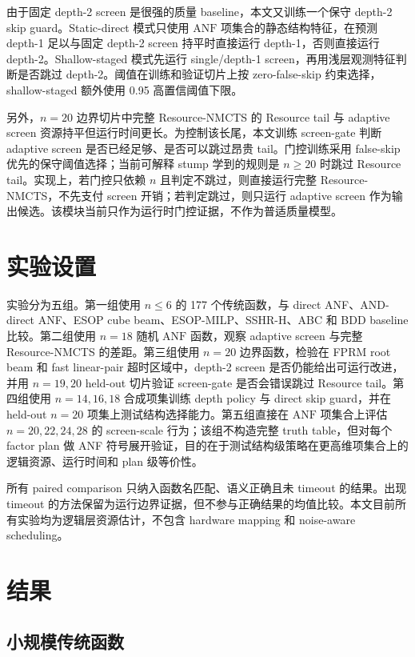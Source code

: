 \documentclass[UTF8,fontset=macnew,11pt]{ctexart}
\newcommand{\method}{Resource-NMCTS}
\newcommand{\anf}{\ensuremath{\mathrm{ANF}}}
\begin{document}
由于固定 depth-2 screen 是很强的质量 baseline，本文又训练一个保守 depth-2 skip guard。Static-direct 模式只使用 \anf{} 项集合的静态结构特征，在预测 depth-1 足以与固定 depth-2 screen 持平时直接运行 depth-1，否则直接运行 depth-2。Shallow-staged 模式先运行 single/depth-1 screen，再用浅层观测特征判断是否跳过 depth-2。阈值在训练和验证切片上按 zero-false-skip 约束选择，shallow-staged 额外使用 0.95 高置信阈值下限。

另外，$n=20$ 边界切片中完整 \method{} 的 Resource tail 与 adaptive screen 资源持平但运行时间更长。为控制该长尾，本文训练 screen-gate 判断 adaptive screen 是否已经足够、是否可以跳过昂贵 tail。门控训练采用 false-skip 优先的保守阈值选择；当前可解释 stump 学到的规则是 $n\geq20$ 时跳过 Resource tail。实现上，若门控只依赖 $n$ 且判定不跳过，则直接运行完整 \method{}，不先支付 screen 开销；若判定跳过，则只运行 adaptive screen 作为输出候选。该模块当前只作为运行时门控证据，不作为普适质量模型。

\section{实验设置}

实验分为五组。第一组使用 $n\leq6$ 的 177 个传统函数，与 direct ANF、AND-direct ANF、ESOP cube beam、ESOP-MILP、SSHR-H、ABC 和 BDD baseline 比较。第二组使用 $n=18$ 随机 \anf{} 函数，观察 adaptive screen 与完整 \method{} 的差距。第三组使用 $n=20$ 边界函数，检验在 FPRM root beam 和 fast linear-pair 超时区域中，depth-2 screen 是否仍能给出可运行改进，并用 $n=19,20$ held-out 切片验证 screen-gate 是否会错误跳过 Resource tail。第四组使用 $n=14,16,18$ 合成项集训练 depth policy 与 direct skip guard，并在 held-out $n=20$ 项集上测试结构选择能力。第五组直接在 \anf{} 项集合上评估 $n=20,22,24,28$ 的 screen-scale 行为；该组不构造完整 truth table，但对每个 factor plan 做 ANF 符号展开验证，目的在于测试结构级策略在更高维项集合上的逻辑资源、运行时间和 plan 级等价性。

所有 paired comparison 只纳入函数名匹配、语义正确且未 timeout 的结果。出现 timeout 的方法保留为运行边界证据，但不参与正确结果的均值比较。本文目前所有实验均为逻辑层资源估计，不包含 hardware mapping 和 noise-aware scheduling。

\section{结果}

\subsection{小规模传统函数}
\end{document}
